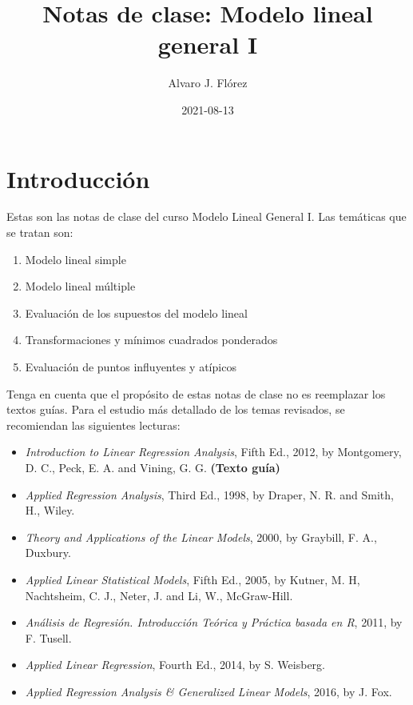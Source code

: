 \documentclass[
]{article}
\title{Notas de clase: Modelo lineal general I}
\author{Alvaro J. Flórez}
\date{2021-08-13}
\providecommand{\tightlist}{%
  \setlength{\itemsep}{0pt}\setlength{\parskip}{0pt}}
\begin{document}
\maketitle

{
\setcounter{tocdepth}{2}
\tableofcontents
}
\hypertarget{introducciuxf3n}{%
\section*{Introducción}\label{introducciuxf3n}}

Estas son las notas de clase del curso Modelo Lineal General I. Las temáticas que se tratan son:

\begin{enumerate}
\def\labelenumi{\arabic{enumi}.}
\tightlist
\item
  Modelo lineal simple
\item
  Modelo lineal múltiple
\item
  Evaluación de los supuestos del modelo lineal
\item
  Transformaciones y mínimos cuadrados ponderados
\item
  Evaluación de puntos influyentes y atípicos
\end{enumerate}

Tenga en cuenta que el propósito de estas notas de clase no es reemplazar los textos guías. Para el estudio más detallado de los temas revisados, se recomiendan las siguientes lecturas:

\begin{itemize}
\tightlist
\item
  \emph{Introduction to Linear Regression Analysis}, Fifth Ed., 2012, by Montgomery, D. C., Peck, E. A. and Vining, G. G. \textbf{(Texto guía)}
\item
  \emph{Applied Regression Analysis}, Third Ed., 1998, by Draper, N. R. and Smith, H., Wiley.
\item
  \emph{Theory and Applications of the Linear Models}, 2000, by Graybill, F. A., Duxbury.
\item
  \emph{Applied Linear Statistical Models}, Fifth Ed., 2005, by Kutner, M. H, Nachtsheim, C. J., Neter, J. and Li, W., McGraw-Hill.
\item
  \emph{Análisis de Regresión. Introducción Teórica y Práctica basada en R}, 2011, by F. Tusell.
\item
  \emph{Applied Linear Regression}, Fourth Ed., 2014, by S. Weisberg.
\item
  \emph{Applied Regression Analysis \& Generalized Linear Models}, 2016, by J. Fox.
\end{itemize}
\end{document}
